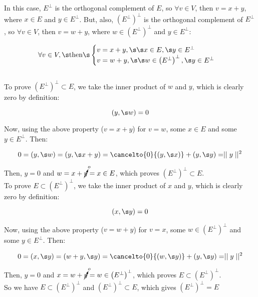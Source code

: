 In this case, $E^\perp$ is the orthogonal complement of $E$, so $\forall v\in V$, then $v=x+y$, where $x\in E$ and $y\in E^\perp$. But, also, $\left(E^\perp\right)^\perp$ is the orthogonal complement of $E^\perp$, so $\forall v\in V$, then $v=w+y$, where $w\in \left(E^\perp\right)^\perp$ and $y\in E^\perp$:

$$\forall v\in V,\s \text{then}\s 
\begin{cases}
      v=x+y,\s\s x\in E, \s y\in E^\perp\\
      v=w+y, \s\s w\in \left(E^\perp\right)^\perp, \s y\in E^\perp\\
\end{cases}$$\\

To prove $\left(E^\perp\right)^\perp\subset E$, we take the inner product of $w$ and $y$, which is clearly zero by definition:

$$(y,\s w)=0$$

Now, using the above property ($v=x+y$) for $v=w$, some $x\in E$ and some $y\in E^\perp$. Then:

$$0=(y,\s w)=(y,\s x+y)=\cancelto{0}{(y,\s x)}+(y,\s y)=\mid\mid y \mid\mid ^2$$

Then, $y=0$ and $w=x+\cancelto{o}{y}=x\in E$, which proves $\left(E^\perp\right)^\perp\subset E$.\\

To prove $E\subset \left(E^\perp\right)^\perp$, we take the inner product of $x$ and $y$, which is clearly zero by definition:

$$(x,\s y)=0$$

Now, using the above property ($v=w+y$) for $v=x$, some $w\in \left(E^\perp\right)^\perp$ and some $y\in E^\perp$. Then:

$$0=(x,\s y)=(w+y,\s y)=\cancelto{0}{(w,\s y)}+(y,\s y)=\mid\mid y \mid\mid ^2$$

Then, $y=0$ and $x=w+\cancelto{o}{y}=w\in \left(E^\perp\right)^\perp$, which proves $E\subset \left(E^\perp\right)^\perp$.\\

So we have $E\subset \left(E^\perp\right)^\perp$ and $\left(E^\perp\right)^\perp\subset E$, which gives $\left(E^\perp\right)^\perp= E$





